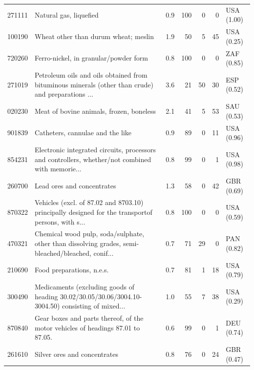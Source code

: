 \begin{tabular}{@{}l p{6.4cm} r r r r l@{}}
271111 & Natural gas, liquefied & 0.9 & 100 & 0 & 0 & USA (1.00) \\
100190 & Wheat other than durum wheat; meslin & 1.9 & 50 & 5 & 45 & USA (0.25) \\
720260 & Ferro-nickel, in granular/\allowbreak{}powder form & 0.8 & 100 & 0 & 0 & ZAF (0.85) \\
271019 & Petroleum oils and oils obtained from bituminous minerals (other than crude) and preparations ... & 3.6 & 21 & 50 & 30 & ESP (0.52) \\
020230 & Meat of bovine animals, frozen, boneless & 2.1 & 41 & 5 & 53 & SAU (0.53) \\
901839 & Catheters, cannulae and the like & 0.9 & 89 & 0 & 11 & USA (0.96) \\
854231 & Electronic integrated  circuits, processors and controllers, whether/\allowbreak{}not combined with memorie... & 0.8 & 99 & 0 & 1 & USA (0.98) \\
260700 & Lead ores and concentrates & 1.3 & 58 & 0 & 42 & GBR (0.69) \\
870322 & Vehicles (excl. of 87.02 and 8703.10) principally designed for the transportof persons, with s... & 0.8 & 100 & 0 & 0 & USA (0.59) \\
470321 & Chemical wood pulp, soda/\allowbreak{}sulphate, other than dissolving grades, semi-bleached/\allowbreak{}bleached, conif... & 0.7 & 71 & 29 & 0 & PAN (0.82) \\
210690 & Food preparations, n.e.s. & 0.7 & 81 & 1 & 18 & USA (0.79) \\
300490 & Medicaments (excluding goods of heading 30.02/\allowbreak{}30.05/\allowbreak{}30.06/\allowbreak{}3004.10-3004.50) consisting of mixed... & 1.0 & 55 & 7 & 38 & USA (0.29) \\
870840 & Gear boxes and parts thereof, of the motor vehicles of headings 87.01 to 87.05. & 0.6 & 99 & 0 & 1 & DEU (0.74) \\
261610 & Silver ores and concentrates & 0.8 & 76 & 0 & 24 & GBR (0.47) \\
\bottomrule
\end{tabular}
